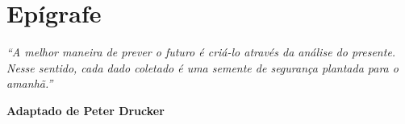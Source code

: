 \chapter*{Epígrafe}

\begin{flushright}
\textit{``A melhor maneira de prever o futuro é criá-lo através da análise do presente. Nesse sentido, cada dado coletado é uma semente de segurança plantada para o amanhã.''}

\hfill \textbf{Adaptado de Peter Drucker}
\end{flushright}